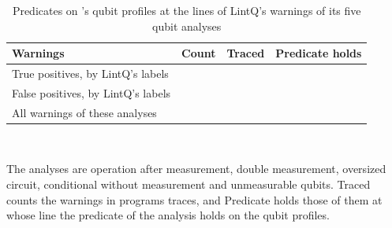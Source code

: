 \begin{table}[t]
  \centering
  \caption{Predicates on \tool{}'s qubit profiles at the lines of LintQ's warnings of its five qubit analyses}
  \label{tab:b-lintq}
  \footnotesize\setlength{\tabcolsep}{4pt}\renewcommand{\arraystretch}{1.12}
  \newcommand{\sep}{\arrayrulecolor{black!25}\hline\arrayrulecolor{black}}
  \begin{tabular}{@{}l r r r@{}}
    \toprule
    \rowcolor{black!8}\textbf{Warnings} & \textbf{Count} & \textbf{Traced} & \textbf{Predicate holds} \\
    \midrule
    True positives, by LintQ's labels & \numLqQubitTp{} & \numLqQubitTraced{} & \numLqQubitExposed{} \\ \sep
    False positives, by LintQ's labels & \numLqFpWarnings{} & \numLqFpTraced{} & \numLqFpFires{} \\ \sep
    All warnings of these analyses & \numLqSarifWarnings{} & \numLqSarifTraced{} & \numLqSarifFires{} \\
    \bottomrule
  \end{tabular}\\[3pt]
  \begin{minipage}{\columnwidth}\footnotesize
  The analyses are operation after measurement, double measurement, oversized circuit, conditional without measurement
  and unmeasurable qubits. Traced counts the warnings in programs \tool{} traces, and Predicate holds those of them at
  whose line the predicate of the analysis holds on the qubit profiles.
  \end{minipage}
\end{table}

